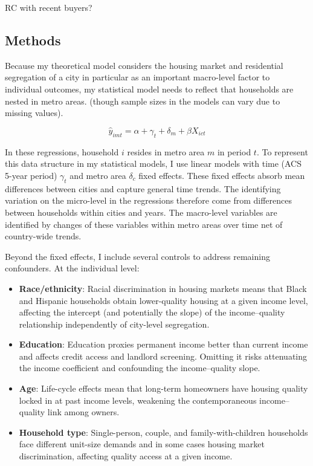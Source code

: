 RC with recent buyers?

\subsection{Methods}

Because my theoretical model considers the housing market and residential segregation of a city in particular as an important macro-level factor to individual outcomes, my statistical model needs to reflect that households are nested in metro areas.  (though sample sizes in the models can vary due to missing values). 

\begin{equation}
\hat{y}_{imt} = \alpha + \gamma_t + \delta_m + \beta X_{ict}
\end{equation}

In these regressions, household $i$ resides in metro area $m$ in period $t$. To represent this data structure in my statistical models, I use linear models with  time (ACS 5-year period) $\gamma_t$ and metro area $\delta_c$ fixed effects. These fixed effects absorb mean differences between cities and capture general time trends. The identifying variation on the micro-level in the regressions therefore come from differences between households within cities and years. The macro-level variables are identified by changes of these variables within metro areas over time net of country-wide trends.

Beyond the fixed effects, I include several controls to address remaining confounders. At the individual level:

\begin{itemize}
  \item \textbf{Race/ethnicity}: Racial discrimination in housing markets means that Black and Hispanic households obtain lower-quality housing at a given income level, affecting the intercept (and potentially the slope) of the income--quality relationship independently of city-level segregation.
  \item \textbf{Education}: Education proxies permanent income better than current income and affects credit access and landlord screening. Omitting it risks attenuating the income coefficient and confounding the income--quality slope.
  \item \textbf{Age}: Life-cycle effects mean that long-term homeowners have housing quality locked in at past income levels, weakening the contemporaneous income--quality link among owners.
  \item \textbf{Household type}: Single-person, couple, and family-with-children households face different unit-size demands and in some cases housing market discrimination, affecting quality access at a given income.
\end{itemize}

